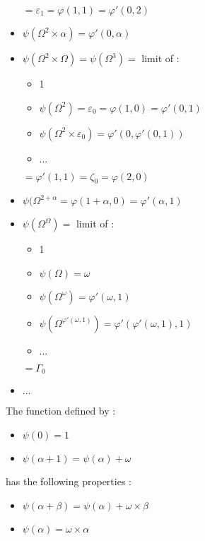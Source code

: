 \documentclass[10pt]{article}
\begin{document}
\begin{itemize}
\begin{itemize}
   \end{itemize}
   \( = \varepsilon_1 = \varphi(1,1) = \varphi'(0,2) \)
\item \( \psi(\Omega^2 \times \alpha) = \varphi'(0,\alpha) \)
\item \( \psi(\Omega^2 \times \Omega) = \psi(\Omega^3) = \) limit of :
   \begin{itemize}
     \setlength{\itemsep}{1pt}
     \setlength{\parskip}{0pt}
     \setlength{\parsep}{0pt}
   \item 1
   \item \( \psi(\Omega^2) = \varepsilon_0 = \varphi(1,0) = \varphi'(0,1) \)
   \item \( \psi(\Omega^2 \times \varepsilon_0) = \varphi'(0,\varphi'(0,1)) \)
   \item \( \ldots \)
   \end{itemize}
   \( = \varphi'(1,1) = \zeta_0 = \varphi(2,0) \)
\item \( \psi(\Omega^{2+\alpha} = \varphi(1+\alpha,0) = \varphi'(\alpha,1) \)
\item \( \psi(\Omega^\Omega) = \) limit of : 
   \begin{itemize}
     \setlength{\itemsep}{1pt}
     \setlength{\parskip}{0pt}
     \setlength{\parsep}{0pt}
   \item 1
   \item \( \psi(\Omega) = \omega \)
   \item \( \psi(\Omega^\omega) = \varphi'(\omega,1) \)
   \item \( \psi(\Omega^{\varphi'(\omega,1)}) = \varphi'(\varphi'(\omega,1),1) \)
   \item \( \ldots \)
   \end{itemize} 
   \( = \Gamma_0 \)
\item \( \ldots \)
\end{itemize}

\bigskip

The function defined by :

\begin{itemize}
     \setlength{\itemsep}{1pt}
     \setlength{\parskip}{0pt}
     \setlength{\parsep}{0pt}
\item \( \psi(0) = 1 \)
\item \( \psi(\alpha+1) = \psi(\alpha)+\omega \)
\end{itemize}

has the following properties :

\begin{itemize}
     \setlength{\itemsep}{1pt}
     \setlength{\parskip}{0pt}
     \setlength{\parsep}{0pt}
\item \( \psi(\alpha+\beta)=\psi(\alpha)+\omega \times \beta \)
\item \( \psi(\alpha) = \omega \times \alpha \)
\end{itemize}
\end{document}

